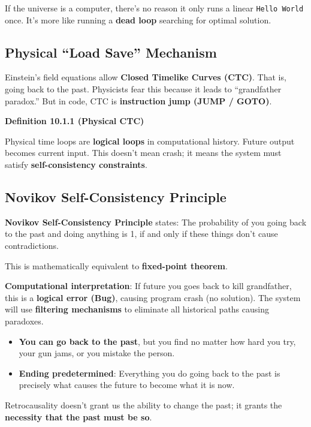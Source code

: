 If the universe is a computer, there's no reason it only runs a linear \texttt{Hello World} once. It's more like running a \textbf{dead loop} searching for optimal solution.

\subsection{Physical ``Load Save'' Mechanism}

Einstein's field equations allow \textbf{Closed Timelike Curves (CTC)}. That is, going back to the past.
Physicists fear this because it leads to ``grandfather paradox.''
But in code, CTC is \textbf{instruction jump (JUMP / GOTO)}.

\textbf{Definition 10.1.1 (Physical CTC)}

Physical time loops are \textbf{logical loops} in computational history.
Future output becomes current input. This doesn't mean crash; it means the system must satisfy \textbf{self-consistency constraints}.

\subsection{Novikov Self-Consistency Principle}

\textbf{Novikov Self-Consistency Principle} states: The probability of you going back to the past and doing anything is 1, if and only if these things don't cause contradictions.

This is mathematically equivalent to \textbf{fixed-point theorem}.

\textbf{Computational interpretation}:
If future you goes back to kill grandfather, this is a \textbf{logical error (Bug)}, causing program crash (no solution).
The system will use \textbf{filtering mechanisms} to eliminate all historical paths causing paradoxes.

\begin{itemize}
\item \textbf{You can go back to the past}, but you find no matter how hard you try, your gun jams, or you mistake the person.
\item \textbf{Ending predetermined}: Everything you do going back to the past is precisely what causes the future to become what it is now.
\end{itemize}

Retrocausality doesn't grant us the ability to change the past; it grants the \textbf{necessity that the past must be so}.

